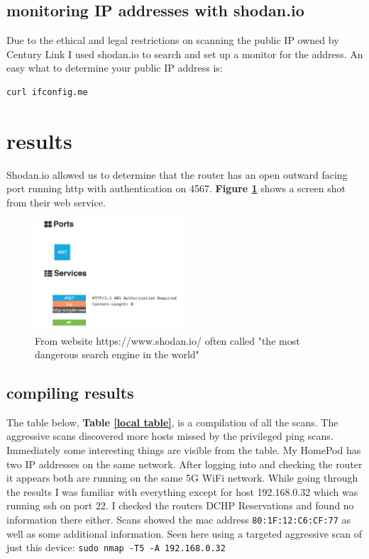 \documentclass[10pt]{article}
\begin{document}
\subsection*{monitoring IP addresses with shodan.io}
Due to the ethical and legal restrictions on scanning the public IP owned by Century Link I used shodan.io to search and set up a monitor for the address.\cite{shodan}
An easy what to determine your public IP address is:
\begin{verbatim}
curl ifconfig.me
\end{verbatim}

\section*{results}
Shodan.io allowed us to determine that the router has an open outward facing port running http with authentication on 4567.\cite{shodan} \textbf{Figure \ref{shodan image}} 
shows a screen shot from their web service.

\begin{figure}[H]
\centering
\includegraphics[width=0.5\textwidth]{shodan.png}
\caption{From website https://www.shodan.io/ often called "the most dangerous search engine in the world"}\label{shodan image}
\end{figure}

\subsection*{compiling results}
The table below, \textbf{Table \ref{local table}}, is a compilation of all the scans. The aggressive scans discovered more hosts missed by the privileged ping scans.
Immediately some interesting things are visible from the table. My HomePod has two IP addresses on the same network. After logging into and checking the router
it appears both are running on the same 5G WiFi network. While going through the results I was familiar with everything except for host 192.168.0.32 which was running ssh
on port 22. I checked the routers DCHP Reservations and found no information there either. Scans showed the mac address \verb|80:1F:12:C6:CF:77| as well as some
additional information. Seen here using a targeted aggressive scan of just this device: \verb|sudo nmap -T5 -A 192.168.0.32| 
\end{document}
